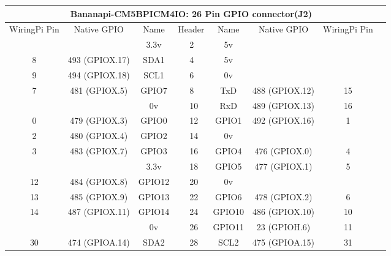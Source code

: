 \documentclass[11pt,a4paper]{article}
\begin{document}
\begin{sffamily}
\begin{center}
\begin{tabular}{|c|c|c||p{8mm}|p{8mm}||c|c|c|c|}
\hline
\multicolumn{8}{|c|}{\bfseries{Bananapi-CM5BPICM4IO: 26 Pin GPIO connector(J2)}}\\
\hline
\hline
WiringPi Pin	& Native GPIO	& Name	& \multicolumn{2}{|c||}{Header}	& Name	& Native GPIO	& WiringPi Pin\\
\hline
\hline
	& 					& \textcolor{rtb-red}{3.3v}		& \raggedleft{1} &  2 & \textcolor{rtb-maroon}{5v}		&			 		& \\
\hline
8	& 493 (GPIOX.17)	& \textcolor{rtb-aqua}{SDA1}	& \raggedleft{3} &  4 & \textcolor{rtb-maroon}{5v}		& 					& \\
\hline
9	& 494 (GPIOX.18)	& \textcolor{rtb-aqua}{SCL1}	& \raggedleft{5} &  6 & \textcolor{rtb-black}{0v}		& 					& \\
\hline
7	& 481 (GPIOX.5)		& \textcolor{rtb-green}{GPIO7}	& \raggedleft{7} &  8 & \textcolor{rtb-yellow}{TxD}		& 488 (GPIOX.12)	& 15\\
\hline
	&			 		& \textcolor{rtb-black}{0v}		& \raggedleft{9} & 10 & \textcolor{rtb-yellow}{RxD}		& 489 (GPIOX.13)	& 16\\
\hline
0	& 479 (GPIOX.3)		& \textcolor{rtb-green}{GPIO0}	& \raggedleft{11} & 12 & \textcolor{rtb-green}{GPIO1}	& 492 (GPIOX.16)	& 1\\
\hline
2	& 480 (GPIOX.4)		& \textcolor{rtb-green}{GPIO2}	& \raggedleft{13} & 14 & \textcolor{rtb-black}{0v}		& 					& \\
\hline
3	& 483 (GPIOX.7)		& \textcolor{rtb-green}{GPIO3}	& \raggedleft{15} & 16 & \textcolor{rtb-green}{GPIO4}	& 476 (GPIOX.0)		& 4\\
\hline
	& 					& \textcolor{rtb-red}{3.3v}		& \raggedleft{17} & 18 & \textcolor{rtb-green}{GPIO5}	& 477 (GPIOX.1)		& 5\\
\hline
12	& 484 (GPIOX.8)		& \textcolor{rtb-green}{GPIO12}	& \raggedleft{19} & 20 & \textcolor{rtb-black}{0v}		& 					& \\
\hline
13	& 485 (GPIOX.9)	& \textcolor{rtb-green}{GPIO13}	& \raggedleft{21} & 22 & \textcolor{rtb-green}{GPIO6}	& 478 (GPIOX.2)		& 6\\
\hline
14	& 487 (GPIOX.11)	& \textcolor{rtb-green}{GPIO14}	& \raggedleft{23} & 24 & \textcolor{rtb-green}{GPIO10}	& 486 (GPIOX.10)	& 10\\
\hline
	& 					& \textcolor{rtb-black}{0v}		& \raggedleft{25} & 26 & \textcolor{rtb-green}{GPIO11}	& 23 (GPIOH.6)	& 11\\
\hline
30	& 474 (GPIOA.14)	& \textcolor{rtb-aqua}{SDA2}	& \raggedleft{27} & 28 & \textcolor{rtb-aqua}{SCL2}		& 475 (GPIOA.15)	& 31\\

\end{tabular}
\end{center}
\end{sffamily}
\end{document}
